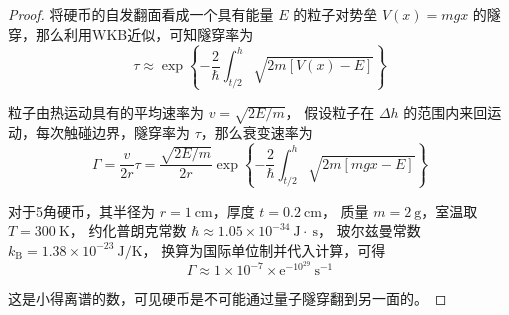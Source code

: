 \begin{proof}
将硬币的自发翻面看成一个具有能量 $E$ 的粒子对势垒 $V(x)=m g x$ 的隧穿，那么利用WKB近似，可知隧穿率为
$$\tau \approx \exp \left\{-\frac{2}{\hbar} \int_{t / 2}^{h} \sqrt{2 m[V(x)-E]}\right\}$$

粒子由热运动具有的平均速率为 $v=\sqrt{2 E / m}$，
假设粒子在 $\Delta h$ 的范围内来回运动，每次触碰边界，隧穿率为 $\tau$，那么衰变速率为
$$\Gamma=\frac{v}{2 r} \tau=\frac{\sqrt{2 E / m}}{2 r} \exp \left\{-\frac{2}{\hbar} \int_{t / 2}^{h} \sqrt{2 m[m g x-E]}\right\}$$

对于5角硬币，其半径为 $r=1 \mathrm{~cm}$，厚度 $t=0.2 \mathrm{~cm}$，
质量 $m=2 \mathrm{~g}$，室温取 $T=300 \mathrm{~K}$，
约化普朗克常数 $\hbar \approx 1.05 \times 10^{-34} \mathrm{~J} \cdot \mathrm{~s}$，
玻尔兹曼常数 $k_{\mathrm{B}}=1.38 \times 10^{-23} \mathrm{~J} / \mathrm{K}$，
换算为国际单位制并代入计算，可得
$$\Gamma \approx 1 \times 10^{-7} \times \mathrm{e}^{-10^{29}} \mathrm{~s}^{-1}$$

这是小得离谱的数，可见硬币是不可能通过量子隧穿翻到另一面的。
\end{proof}

